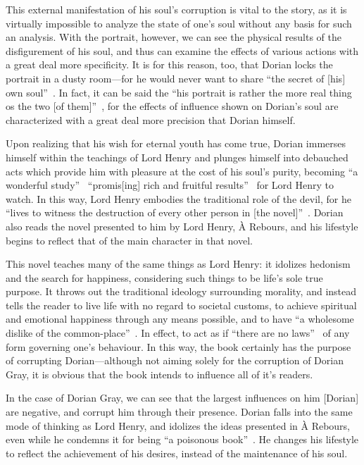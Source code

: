 \documentclass[12pt]{article}
\begin{document}
This external manifestation of his soul's corruption is vital to the story, as it is virtually impossible to analyze the state of one's soul without any basis for such an analysis. With the portrait, however, we can see the physical results of the disfigurement of his soul, and thus can examine the effects of various actions with a great deal more specificity. It is for this reason, too, that Dorian locks the portrait in a dusty room—for he would never want to share ``the secret of [his] own soul''~\cite[7]{wilde}. In fact, it can be said the ``his portrait is rather the more real thing os the two [of them]''~\cite[114]{hawthorne}, for the effects of influence shown on Dorian's soul are characterized with a great deal more precision that Dorian himself.

Upon realizing that his wish for eternal youth has come true, Dorian immerses himself within the teachings of Lord Henry and plunges himself into debauched acts which provide him with pleasure at the cost of his soul's purity, becoming ``a wonderful study''~\cite[76]{wilde} ``promis[ing] rich and fruitful results''~\cite[503]{wainwright} for Lord Henry to watch. In this way, Lord Henry embodies the traditional role of the devil, for he ``lives to witness the destruction of every other person in [the novel]''~\cite[113]{hawthorne}. Dorian also reads the novel presented to him by Lord Henry, À Rebours, and his lifestyle begins to reflect that of the main character in that novel.

This novel teaches many of the same things as Lord Henry: it idolizes hedonism and the search for happiness, considering such things to be life's sole true purpose. It throws out the traditional ideology surrounding morality, and instead tells the reader to live life with no regard to societal customs, to achieve spiritual and emotional happiness through any means possible, and to have ``a wholesome dislike of the common-place''~\cite[115]{pater}. In effect, to act as if ``there are no laws''~\cite[125]{ellman} of any form governing one's behaviour. In this way, the book certainly has the purpose of corrupting Dorian—although not aiming solely for the corruption of Dorian Gray, it is obvious that the book intends to influence all of it's readers.

In the case of Dorian Gray, we can see that the largest influences on him [Dorian] are negative, and corrupt him through their presence. Dorian falls into the same mode of thinking as Lord Henry, and idolizes the ideas presented in À Rebours, even while he condemns it for being ``a poisonous book''~\cite[128]{wilde}. He changes his lifestyle to reflect the achievement of his desires, instead of the maintenance of his soul.
\end{document}
